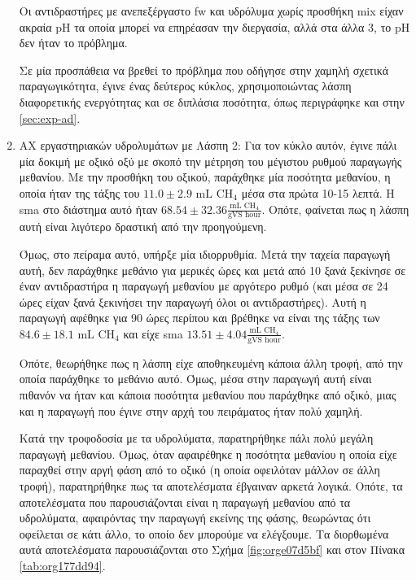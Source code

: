 \documentclass[11pt]{report}
\begin{document}
\begin{enumerate}
Οι αντιδραστήρες με ανεπεξέργαστο \acrshort{fw} και υδρόλυμα χωρίς προσθήκη \acrshort{mix} είχαν ακραία pH τα οποία μπορεί να επηρέασαν την διεργασία, αλλά στα άλλα 3, το pH δεν ήταν το πρόβλημα.

Σε μία προσπάθεια να βρεθεί το πρόβλημα που οδήγησε στην χαμηλή σχετικά παραγωγικότητα, έγινε ένας δεύτερος κύκλος, χρησιμοποιώντας λάσπη διαφορετικής ενεργότητας και σε διπλάσια ποσότητα, όπως περιγράφηκε και στην \autoref{sec:exp-ad}.

\item ΑΧ εργαστηριακών υδρολυμάτων με Λάσπη 2:
\label{sec:org2a989ac}
Για τον κύκλο αυτόν, έγινε πάλι μία δοκιμή με οξικό οξύ με σκοπό την μέτρηση του μέγιστου ρυθμού παραγωγής μεθανίου. Με την προσθήκη του οξικού, παράχθηκε μία ποσότητα μεθανίου, η οποία ήταν της τάξης του \(11.0 \pm 2.9 \text{ mL CH$_4$}\) μέσα στα πρώτα 10-15 λεπτά. H \acrshort{sma} στο διάστημα αυτό ήταν \(68.54 \pm 32.36 \frac{\text{mL CH$_4$}}{\text{gVS hour}}\). Οπότε, φαίνεται πως η λάσπη αυτή είναι λιγότερο δραστική από την προηγούμενη.

Όμως, στο πείραμα αυτό, υπήρξε μία ιδιορρυθμία. Μετά την ταχεία παραγωγή αυτή, δεν παράχθηκε μεθάνιο για μερικές ώρες και μετά από 10 ξανά ξεκίνησε σε έναν αντιδραστήρα η παραγωγή μεθανίου με αργότερο ρυθμό (και μέσα σε 24 ώρες είχαν ξανά ξεκινήσει την παραγωγή όλοι οι αντιδραστήρες). Αυτή η παραγωγή αφέθηκε για 90 ώρες περίπου και βρέθηκε να είναι της τάξης των \(84.6 \pm 18.1 \text{ mL CH$_4$}\) και είχε \acrshort{sma} \(13.51 \pm 4.04 \frac{\text{mL CH$_4$}}{\text{gVS hour}}\).

Οπότε, θεωρήθηκε πως η λάσπη είχε αποθηκευμένη κάποια άλλη τροφή, από την οποία παράχθηκε το μεθάνιο αυτό. Όμως, μέσα στην παραγωγή αυτή είναι πιθανόν να ήταν και κάποια ποσότητα μεθανίου που παράχθηκε από οξικό, μιας και η παραγωγή που έγινε στην αρχή του πειράματος ήταν πολύ χαμηλή.

Κατά την τροφοδοσία με τα υδρολύματα, παρατηρήθηκε πάλι πολύ μεγάλη παραγωγή μεθανίου. Όμως, όταν αφαιρέθηκε η ποσότητα μεθανίου η οποία είχε παραχθεί στην αργή φάση από το οξικό (η οποία οφειλόταν μάλλον σε άλλη τροφή), παρατηρήθηκε πως τα αποτελέσματα έβγαιναν αρκετά λογικά. Οπότε, τα αποτελέσματα που παρουσιάζονται είναι η παραγωγή μεθανίου από τα υδρολύματα, αφαιρόντας την παραγωγή εκείνης της φάσης, θεωρώντας ότι οφείλεται σε κάτι άλλο, το οποίο δεν μπορούμε να ελέγξουμε. Τα διορθωμένα αυτά αποτελέσματα παρουσιάζονται στο Σχήμα \ref{fig:orge07d5bf} και στον Πίνακα \ref{tab:org177dd94}.


\end{enumerate}
\end{document}
